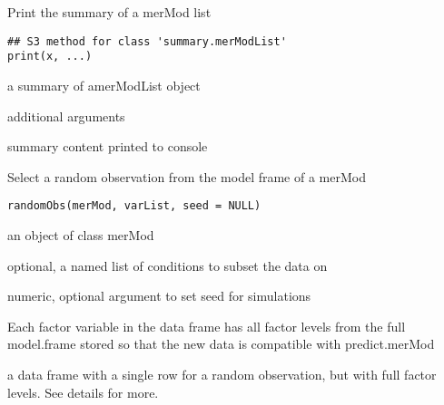 \documentclass[letterpaper]{book}
\begin{document}
%
\begin{Description}\relax
Print the summary of a merMod list
\end{Description}
%
\begin{Usage}
\begin{verbatim}
## S3 method for class 'summary.merModList'
print(x, ...)
\end{verbatim}
\end{Usage}
%
\begin{Arguments}
\begin{ldescription}
\item[\code{x}] a summary of amerModList object

\item[\code{...}] additional arguments
\end{ldescription}
\end{Arguments}
%
\begin{Value}
summary content printed to console
\end{Value}
%
\begin{Description}\relax
Select a random observation from the model frame of a merMod
\end{Description}
%
\begin{Usage}
\begin{verbatim}
randomObs(merMod, varList, seed = NULL)
\end{verbatim}
\end{Usage}
%
\begin{Arguments}
\begin{ldescription}
\item[\code{merMod}] an object of class merMod

\item[\code{varList}] optional, a named list of conditions to subset the data on

\item[\code{seed}] numeric, optional argument to set seed for simulations
\end{ldescription}
\end{Arguments}
%
\begin{Details}\relax
Each factor variable in the data frame has all factor levels from the
full model.frame stored so that the new data is compatible with predict.merMod
\end{Details}
%
\begin{Value}
a data frame with a single row for a random observation, but with full
factor levels. See details for more.
\end{Value}
\end{document}
